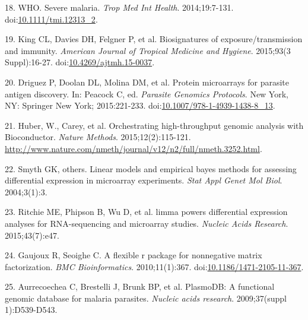 \documentclass[]{article}
\begin{document}
\hypertarget{ref-WHO2014severe}{}
18. WHO. Severe malaria. \emph{Trop Med Int Health}. 2014;19:7-131.
doi:\href{https://doi.org/10.1111/tmi.12313_2}{10.1111/tmi.12313\_2}.

\hypertarget{ref-King2015FOC}{}
19. King CL, Davies DH, Felgner P, et al. Biosignatures of
exposure/transmission and immunity. \emph{American Journal of Tropical
Medicine and Hygiene}. 2015;93(3 Suppl):16-27.
doi:\href{https://doi.org/10.4269/ajtmh.15-0037}{10.4269/ajtmh.15-0037}.

\hypertarget{ref-Driguez2015}{}
20. Driguez P, Doolan DL, Molina DM, et al. Protein microarrays for
parasite antigen discovery. In: Peacock C, ed. \emph{Parasite Genomics
Protocols}. New York, NY: Springer New York; 2015:221-233.
doi:\href{https://doi.org/10.1007/978-1-4939-1438-8_13}{10.1007/978-1-4939-1438-8\_13}.

\hypertarget{ref-Biobase}{}
21. Huber, W., Carey, et al. Orchestrating high-throughput genomic
analysis with Bioconductor. \emph{Nature Methods}. 2015;12(2):115-121.
\url{http://www.nature.com/nmeth/journal/v12/n2/full/nmeth.3252.html}.

\hypertarget{ref-smyth2004ebayes}{}
22. Smyth GK, others. Linear models and empirical bayes methods for
assessing differential expression in microarray experiments. \emph{Stat
Appl Genet Mol Biol}. 2004;3(1):3.

\hypertarget{ref-limma}{}
23. Ritchie ME, Phipson B, Wu D, et al. limma powers differential
expression analyses for RNA-sequencing and microarray studies.
\emph{Nucleic Acids Research}. 2015;43(7):e47.

\hypertarget{ref-Gaujoux2010NMF}{}
24. Gaujoux R, Seoighe C. A flexible r package for nonnegative matrix
factorization. \emph{BMC Bioinformatics}. 2010;11(1):367.
doi:\href{https://doi.org/10.1186/1471-2105-11-367}{10.1186/1471-2105-11-367}.

\hypertarget{ref-plasmodb}{}
25. Aurrecoechea C, Brestelli J, Brunk BP, et al. PlasmoDB: A functional
genomic database for malaria parasites. \emph{Nucleic acids research}.
2009;37(suppl 1):D539-D543.
\end{document}

